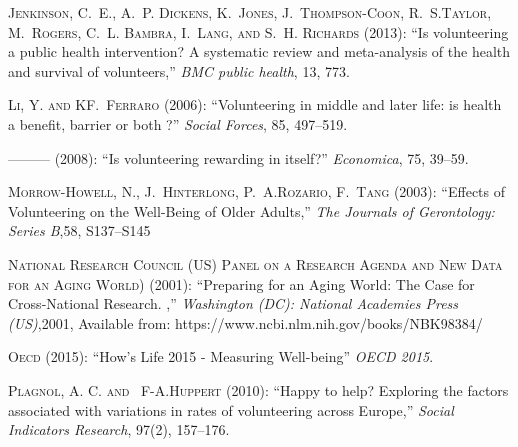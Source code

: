 \documentclass[10pt, letterpaper]{article}
\begin{document}
\begin{spacing}{1.4}
\begin{thebibliography}{87}
\textsc{Jenkinson, C.~E., A.~P. Dickens, K.~Jones, J.~Thompson-Coon, R.~S.Taylor, M.~Rogers, C.~L. Bambra, I.~Lang, and S.~H. Richards} (2013):
  \enquote{Is volunteering a public health intervention? A systematic review and meta-analysis of the health and survival of volunteers,} \emph{BMC public health}, 13, 773.

\textsc{Li, Y. and KF.~Ferraro} (2006): \enquote{Volunteering in middle and later life: is health a benefit, barrier or both ?} \emph{Social Forces}, 85, 497--519. 


---\hspace{-.1pt}---\hspace{-.1pt}--- (2008{}): \enquote{Is volunteering rewarding in itself?} \emph{Economica}, 75, 39--59.

\textsc{Morrow-Howell, N., J.~Hinterlong, P.~A.Rozario, F.~Tang} (2003):
  \enquote{Effects of Volunteering on the Well-Being of Older Adults,} \emph{The Journals of Gerontology: Series B},58, S137--S145

\textsc{National Research Council (US) Panel on a Research Agenda and New Data for an Aging World)} (2001):
  \enquote{Preparing for an Aging World: The Case for Cross-National Research. ,} \emph{Washington (DC): National Academies Press (US)},2001, Available from: https://www.ncbi.nlm.nih.gov/books/NBK98384/


\textsc{Oecd} (2015): \enquote{How's Life  2015 - Measuring Well-being} \emph{OECD 2015}.

\textsc{Plagnol, A. C. and ~F-A.Huppert } (2010): \enquote{Happy to help? Exploring the factors associated with variations in rates of volunteering across Europe,} \emph{Social Indicators Research}, 97(2), 157--176.
  

\end{thebibliography}
\end{spacing}
\end{document}
